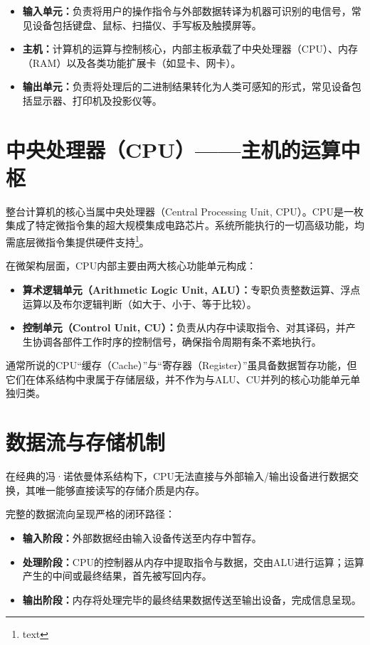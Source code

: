 \documentclass[12pt,UTF8]{ctexbook}
\begin{document}
\begin{itemize}
\item \textbf{输入单元：}负责将用户的操作指令与外部数据转译为机器可识别的电信号，常见设备包括键盘、鼠标、扫描仪、手写板及触摸屏等。
\item \textbf{主机：}计算机的运算与控制核心，内部主板承载了中央处理器（CPU）、内存（RAM）以及各类功能扩展卡（如显卡、网卡）。
\item \textbf{输出单元：}负责将处理后的二进制结果转化为人类可感知的形式，常见设备包括显示器、打印机及投影仪等。
\end{itemize}

\section{中央处理器（CPU）——主机的运算中枢}

整台计算机的核心当属中央处理器（Central Processing Unit, CPU）。CPU是一枚集成了特定微指令集的超大规模集成电路芯片。系统所能执行的一切高级功能，均需底层微指令集提供硬件支持\footnote{text}。

在微架构层面，CPU内部主要由两大核心功能单元构成：

\begin{itemize}
\item \textbf{算术逻辑单元（Arithmetic Logic Unit, ALU）：}专职负责整数运算、浮点运算以及布尔逻辑判断（如大于、小于、等于比较）。
\item \textbf{控制单元（Control Unit, CU）：}负责从内存中读取指令、对其译码，并产生协调各部件工作时序的控制信号，确保指令周期有条不紊地执行。
\end{itemize}

通常所说的CPU“缓存（Cache）”与“寄存器（Register）”虽具备数据暂存功能，但它们在体系结构中隶属于存储层级，并不作为与ALU、CU并列的核心功能单元单独归类。

\section{数据流与存储机制}

在经典的冯·诺依曼体系结构下，CPU无法直接与外部输入/输出设备进行数据交换，其唯一能够直接读写的存储介质是内存。

完整的数据流向呈现严格的闭环路径：

\begin{itemize}
\item \textbf{输入阶段：}外部数据经由输入设备传送至内存中暂存。
\item \textbf{处理阶段：}CPU的控制器从内存中提取指令与数据，交由ALU进行运算；运算产生的中间或最终结果，首先被写回内存。
\item \textbf{输出阶段：}内存将处理完毕的最终结果数据传送至输出设备，完成信息呈现。
\end{itemize}
\end{document}
